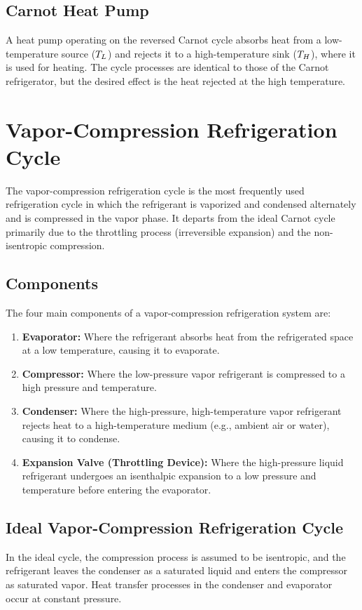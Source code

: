 \subsection{Carnot Heat Pump}
A heat pump operating on the reversed Carnot cycle absorbs heat from a low-temperature source ($T_L$) and rejects it to a high-temperature sink ($T_H$), where it is used for heating. The cycle processes are identical to those of the Carnot refrigerator, but the desired effect is the heat rejected at the high temperature.

\section{Vapor-Compression Refrigeration Cycle}

The vapor-compression refrigeration cycle is the most frequently used refrigeration cycle in which the refrigerant is vaporized and condensed alternately and is compressed in the vapor phase. It departs from the ideal Carnot cycle primarily due to the throttling process (irreversible expansion) and the non-isentropic compression.

\subsection{Components}
The four main components of a vapor-compression refrigeration system are:
\begin{enumerate}
    \item \textbf{Evaporator:} Where the refrigerant absorbs heat from the refrigerated space at a low temperature, causing it to evaporate.
    \item \textbf{Compressor:} Where the low-pressure vapor refrigerant is compressed to a high pressure and temperature.
    \item \textbf{Condenser:} Where the high-pressure, high-temperature vapor refrigerant rejects heat to a high-temperature medium (e.g., ambient air or water), causing it to condense.
    \item \textbf{Expansion Valve (Throttling Device):} Where the high-pressure liquid refrigerant undergoes an isenthalpic expansion to a low pressure and temperature before entering the evaporator.
\end{enumerate}

\subsection{Ideal Vapor-Compression Refrigeration Cycle}
In the ideal cycle, the compression process is assumed to be isentropic, and the refrigerant leaves the condenser as a saturated liquid and enters the compressor as saturated vapor. Heat transfer processes in the condenser and evaporator occur at constant pressure.


